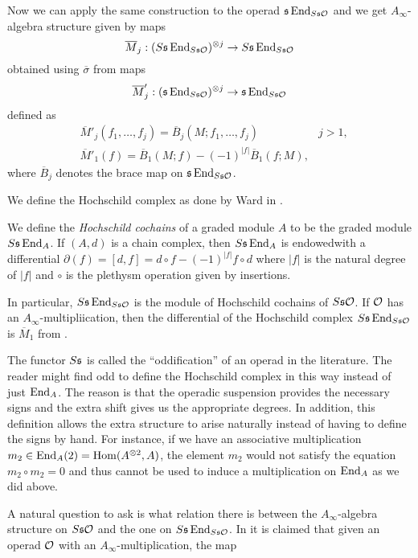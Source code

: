\documentclass[join.tex]{subfiles}
\begin{document}
Now we can apply the same construction to the operad $\mathfrak{s}\operatorname{End}_{S\mathfrak{s}{\mathcal O}}$ and we get $A_\infty$-algebra structure given by maps
\begin{equation}\label{barmaps}
\overline{M}_j:(S\mathfrak{s}\operatorname{End}_{S\mathfrak{s}{\mathcal O}})^{\otimes j}\to S\mathfrak{s}\operatorname{End}_{S\mathfrak{s}{\mathcal O}}
\end{equation}
obtained using $\overline{\sigma}$ from maps
\[\overline{M}'_j:(\mathfrak{s}\operatorname{End}_{S\mathfrak{s}{\mathcal O}})^{\otimes j}\to \mathfrak{s}\operatorname{End}_{S\mathfrak{s}{\mathcal O}}\]
defined as
\begin{align*}
&\overline{M}'_j(f_1,\dots,f_j)=\overline{B}_j(M;f_1,\dots, f_j) & j>1,\\
&\overline{M}'_1(f)=\overline{B}_1(M;f)-(-1)^{|f|}\overline{B}_1(f;M),
\end{align*}
where $\overline{B}_j$ denotes the brace map on $\mathfrak{s}\operatorname{End}_{S\mathfrak{s}{\mathcal O}}$.

We define the Hochschild complex as done by Ward in \cite{ward}.
\begin{defin}
We define the \emph{Hochschild cochains} of a graded module $A$ to be the graded module $S\mathfrak{s}\operatorname{End}_A$. If  $(A,d)$ is a chain complex, then $S\mathfrak{s}\operatorname{End}_A$ is endowedwith a differential $\partial(f)=[d,f]=d\circ f -(-1)^{|f|}f\circ d$ where $|f|$ is the natural degree of $|f|$ and $\circ$ is the plethysm operation given by insertions.
\end{defin}
In particular, $S\mathfrak{s}\operatorname{End}_{S\mathfrak{s}{\mathcal O}}$ is the module of Hochschild cochains of $S\mathfrak{s}{\mathcal O}$. If ${\mathcal O}$ has an $A_\infty$-multipliication, then the differential of the Hochschild complex $S\mathfrak{s}\operatorname{End}_{S\mathfrak{s}{\mathcal O}}$ is $\overline{M}_1$ from .
\begin{remark}
The functor $S\mathfrak{s}$ is called the ``oddification'' of an operad in the literature. %
The reader might find odd to define the Hochschild complex in this way instead of just $\operatorname{End}_A$. The reason is that the operadic suspension provides the necessary signs and the extra shift gives us the appropriate degrees. In addition, this definition allows the extra structure to arise naturally instead of having to define the signs by hand. For instance, if we have an associative multiplication $m_2\in\operatorname{End}_A(2)=\operatorname{Hom}(A^{\otimes 2},A)$, the element $m_2$ would not satisfy the equation $m_2\circ m_2=0$ and thus cannot be used to induce a multiplication on $\operatorname{End}_A$ as we did above.
\end{remark}

 A natural question to ask is what relation there is between the $A_\infty$-algebra structure on $S\mathfrak{s}{\mathcal O}$ and the one on $S\mathfrak{s}\operatorname{End}_{S\mathfrak{s}{\mathcal O}}$. In \cite{GV} it is claimed that given an operad ${\mathcal O}$ with an $A_\infty$-multiplication, the map
\end{document}
